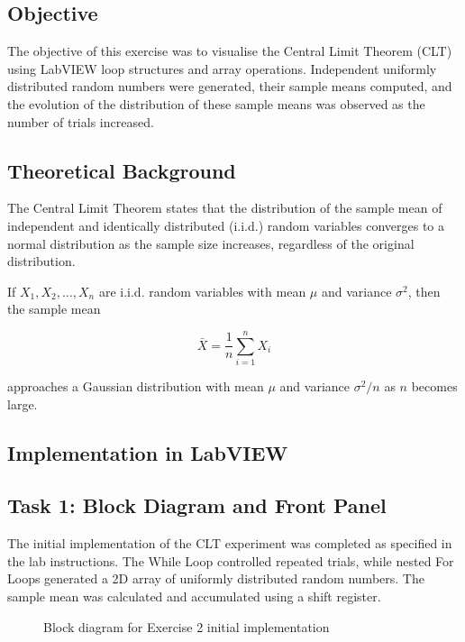 \documentclass[../../main.tex]{subfiles}
\begin{document}
\subsection{Objective}

The objective of this exercise was to visualise the Central Limit Theorem (CLT) using LabVIEW loop structures and array operations. Independent uniformly distributed random numbers were generated, their sample means computed, and the evolution of the distribution of these sample means was observed as the number of trials increased.

\subsection{Theoretical Background}

The Central Limit Theorem states that the distribution of the sample mean of independent and identically distributed (i.i.d.) random variables converges to a normal distribution as the sample size increases, regardless of the original distribution.

If $X_1, X_2, \dots, X_n$ are i.i.d. random variables with mean $\mu$ and variance $\sigma^2$, then the sample mean

\[
\bar{X} = \frac{1}{n} \sum_{i=1}^{n} X_i
\]

approaches a Gaussian distribution with mean $\mu$ and variance $\sigma^2/n$ as $n$ becomes large.

\subsection{Implementation in LabVIEW}

\subsection{Task 1: Block Diagram and Front Panel}

The initial implementation of the CLT experiment was completed as specified in the lab instructions. The While Loop controlled repeated trials, while nested For Loops generated a 2D array of uniformly distributed random numbers. The sample mean was calculated and accumulated using a shift register.

\begin{figure}
    \centering
    \caption{Block diagram for Exercise 2 initial implementation}
\end{figure}
\end{document}
